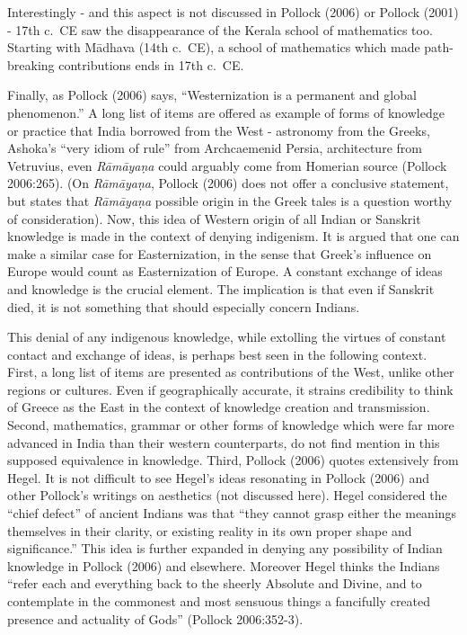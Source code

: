 Interestingly - and this aspect is not discussed in Pollock (2006) or Pollock (2001) - 17th c.\ CE saw the disappearance of the Kerala school of mathematics too. Starting with Mādhava (14th c.\ CE), a school of mathematics which made path-breaking contributions ends in 17th c.~CE.

Finally, as Pollock (2006) says, “Westernization is a permanent and global phenomenon.” A long list of items are offered as example of forms of knowledge or practice that India borrowed from the West - astronomy from the Greeks, Ashoka’s “very idiom of rule” from  Archcaemenid Persia, architecture from Vetruvius, even {\sl Rāmāyaṇa} could arguably come from Homerian source (Pollock 2006:265). (On  {\sl Rāmāyaṇa}, Pollock (2006) does not offer a conclusive statement, but states that {\sl Rāmāyaṇa} possible origin in the Greek tales is a question worthy of consideration). Now, this idea of Western origin of all Indian or Sanskrit knowledge is made in the context of denying indigenism. It is argued that one can make a similar case for Easternization, in the sense that Greek’s influence on Europe would count as Easternization of Europe. A constant exchange of ideas and knowledge is the crucial element. The implication is that even if Sanskrit died, it is not something that should especially concern Indians.

This denial of any indigenous knowledge, while extolling the virtues of constant contact and exchange of ideas, is perhaps best seen in the following context. First, a long list of items are presented as contributions of the West, unlike other regions or cultures. Even if geographically accurate, it strains credibility to think of Greece as the East in the context of knowledge creation and transmission. Second, mathematics, grammar or other forms of knowledge which were far more advanced in India than their western counterparts, do not find mention in this supposed equivalence in knowledge. Third, Pollock (2006) quotes extensively from Hegel. It is not difficult to see Hegel’s ideas resonating in Pollock (2006) and other Pollock’s writings on aesthetics (not discussed here). Hegel considered the “chief defect” of ancient Indians was that “they cannot grasp either the meanings themselves in their clarity, or existing reality in its own proper shape and significance.” This idea is further expanded in denying any possibility of Indian knowledge in Pollock (2006) and elsewhere. Moreover Hegel thinks the Indians “refer each and everything back to the sheerly Absolute and Divine, and to contemplate in the commonest and most sensuous things a fancifully created presence and actuality of Gods” (Pollock 2006:352-3).

